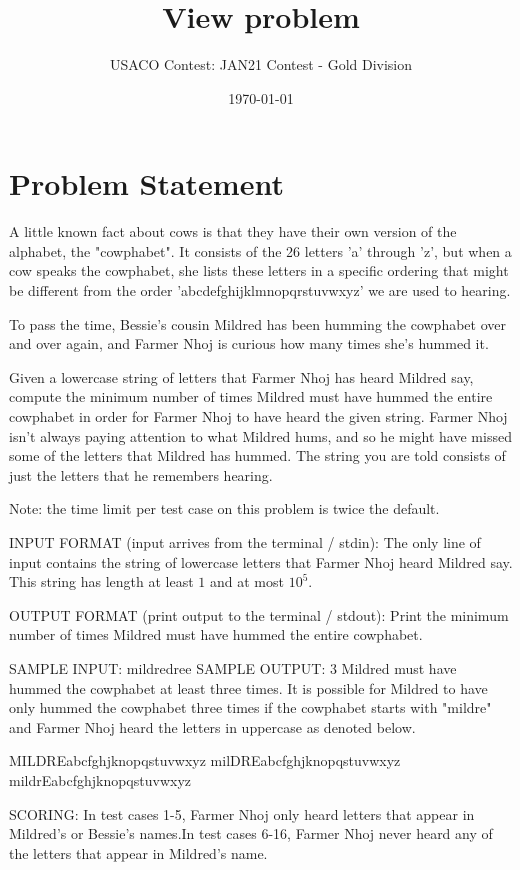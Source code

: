 \documentclass[12pt]{article}
\title{View problem}
\author{USACO Contest: JAN21 Contest - Gold Division}
\date{\today}
\begin{document}
\maketitle

\section*{Problem Statement}

A little known fact about cows is that they have their own version of the
alphabet, the "cowphabet". It consists of the 26 letters 'a' through 'z', but
when a cow speaks the cowphabet, she lists these letters in a specific ordering
that might be different from the order 'abcdefghijklmnopqrstuvwxyz' we are used
to hearing.

To pass the time, Bessie's cousin Mildred has been humming the cowphabet over
and  over again, and Farmer Nhoj is curious how many times she's hummed it.

Given a lowercase string of letters that Farmer Nhoj has heard Mildred say,
compute the minimum number of times Mildred must have hummed the entire
cowphabet in order for Farmer Nhoj to have heard the given string. Farmer Nhoj
isn't always paying attention to what Mildred hums, and so he might have missed
some of the letters that Mildred has hummed. The string you are told consists of
just the letters that he remembers hearing.

Note: the time limit per test case on this problem is twice the default.

INPUT FORMAT (input arrives from the terminal / stdin):
The only line of input contains the string  of lowercase letters that Farmer
Nhoj heard Mildred say.  This string has length at least $1$ and at most $10^5$.

OUTPUT FORMAT (print output to the terminal / stdout):
Print the minimum number of times Mildred must have hummed the entire cowphabet.

SAMPLE INPUT:
mildredree
SAMPLE OUTPUT: 
3
Mildred must have hummed the cowphabet at least three times. It is possible for
Mildred to have only hummed the cowphabet three times if the cowphabet starts
with "mildre" and Farmer Nhoj heard the letters in uppercase as denoted below.


MILDREabcfghjknopqstuvwxyz
milDREabcfghjknopqstuvwxyz
mildrEabcfghjknopqstuvwxyz

SCORING:
In test cases 1-5, Farmer Nhoj only heard letters that appear in Mildred's
or Bessie's names.In test cases 6-16, Farmer Nhoj never heard any of the letters that appear
in Mildred's name.
\end{document}

